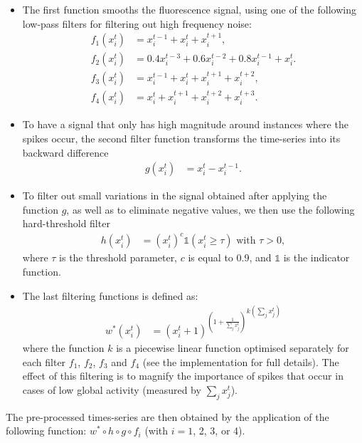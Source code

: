 \documentclass[wcp]{jmlr}
\begin{document}
\begin{itemize}
  \item The first function smooths the fluorescence signal, using one of the following
low-pass filters for filtering out high frequency noise:
\begin{align} f_1(x^t_i) &= x^{t-1}_i + x^t_i + x^{t+1}_i, \label{eq:symetric-median} \\
  f_2(x^t_i) &= 0.4 x^{t-3}_i + 0.6 x^{t-2}_i + 0.8 x^{t-1}_i + x_i^t.\label{eq:weighted-asymetric-median}\\
  f_3(x^t_i) &= x^{t-1}_i + x^{t}_i + x^{t+1}_i + x^{t+2}_i, \label{eq:asymetric-median-forward} \\
f_4(x^t_i) &=  x_i^t + x^{t+1}_i  + x^{t+2}_i + x^{t+3}_i. \label{eq:asymetric-median}
\end{align}
\item To have a signal that only has high magnitude around instances where the
spikes occur, the second filter function transforms the time-series into
its backward difference 
\begin{align} g(x^{t}_{i}) &= x^{t}_i - x^{t-1}_i.
\label{eq:high-pass-filter}
\end{align}
\item To filter out small variations in the signal obtained after applying the
function $g$, as well as to eliminate negative values, we then use the following
hard-threshold filter
\begin{align}\label{eqn:hfilter}
h(x^{t}_i) &= (x^{t}_i)^c \mathbb{1}(x^{t}_i \geq \tau) \text{ with } \tau > 0,
\end{align}
where $\tau$ is the threshold parameter, $c$ is equal to 0.9, and $\mathbb{1}$ is the indicator
function.
\item The last filtering functions is defined as:
\begin{align}
 w^*(x^{t}_i) &= {(x^{t}_i + 1 )^{\left (1 + \frac{1}{\sum_{j} x^{t}_j}\right )}}^{k(\sum_{j} x^{t}_j)}
\end{align}
where the function $k$ is a piecewise linear function optimised
separately for each filter $f_1$, $f_2$, $f_3$ and $f_4$ (see the
implementation for full details). The effect of this filtering is to
magnify the importance of spikes that occur in cases of low global
activity (measured by $\sum_j x^t_j$).
\end{itemize}
The pre-processed times-series are then obtained by the application of
the following function: $w^*\circ h \circ g \circ f_i$ (with
$i=1$, 2, 3, or 4). 
  
\end{document}
